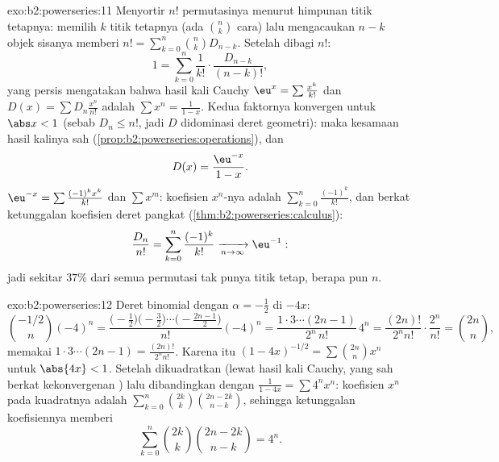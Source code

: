 \begin{solution}{exo:b2:powerseries:11}
Menyortir $n!$ permutasinya menurut himpunan titik tetapnya: memilih
$k$ titik tetapnya (ada $\binom nk$ cara) lalu mengacaukan $n - k$
objek sisanya memberi $n! = \sum_{k=0}^n\binom nk D_{n-k}$.
Setelah dibagi $n!$:
\[
1 = \sum_{k=0}^{n}\frac{1}{k!}\cdot\frac{D_{n-k}}{(n-k)!} ,
\]
yang persis mengatakan bahwa hasil kali Cauchy $\eu^x =
\sum\frac{x^k}{k!}$ dan $D(x) = \sum D_n\frac{x^n}{n!}$ adalah
$\sum x^n = \frac{1}{1-x}$. Kedua faktornya konvergen 
untuk $\abs x < 1$ (sebab $D_n \leq n!$, jadi $D$ didominasi
deret geometri): maka kesamaan hasil kalinya sah
(\cref{prop:b2:powerseries:operations}), dan
\[
D(x) = \frac{\eu^{-x}}{1-x} .
\]
 $\eu^{-x} = \sum\frac{(-1)^kx^k}{k!}$ dan
$\sum x^m$: koefisien $x^n$-nya adalah
$\sum_{k=0}^{n}\frac{(-1)^k}{k!}$, dan berkat ketunggalan koefisien
deret pangkat (\cref{thm:b2:powerseries:calculus}):
\[
\frac{D_n}{n!} = \sum_{k=0}^{n}\frac{(-1)^k}{k!}
\xrightarrow[n\to\infty]{} \eu^{-1} :
\]
jadi sekitar $37\%$ dari semua permutasi tak punya titik tetap, berapa
pun $n$.
\end{solution}

\begin{solution}{exo:b2:powerseries:12}
Deret binomial dengan $\alpha = -\frac12$ di $-4x$:
\[
\binom{-1/2}{n}(-4)^n
= \frac{\bigl(-\frac12\bigr)\bigl(-\frac32\bigr)\cdots
\bigl(-\frac{2n-1}2\bigr)}{n!}(-4)^n
= \frac{1\cdot3\cdots(2n-1)}{2^n\,n!}\,4^n
= \frac{(2n)!}{2^n n!}\cdot\frac{2^n}{n!}
= \binom{2n}{n},
\]
memakai $1\cdot3\cdots(2n-1) = \frac{(2n)!}{2^nn!}$. Karena itu
$(1-4x)^{-1/2} = \sum\binom{2n}nx^n$ untuk $\abs{4x} < 1$.
Setelah dikuadratkan (lewat hasil kali Cauchy, yang sah berkat
kekonvergenan ) lalu dibandingkan dengan
$\frac{1}{1-4x} = \sum 4^nx^n$: koefisien $x^n$ pada
kuadratnya adalah $\sum_{k=0}^n\binom{2k}k\binom{2n-2k}{n-k}$, sehingga
ketunggalan koefisiennya memberi
\[
\sum_{k=0}^{n}\binom{2k}{k}\binom{2n-2k}{n-k} = 4^n .
\]
\end{solution}

